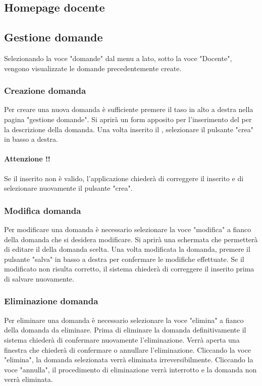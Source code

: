 \documentclass[12pt,a4paper]{article}
\begin{document}
	\subsection{Homepage docente}
	
    \subsection{Gestione domande}

    Selezionando la voce "domande" dal menu a lato, sotto la voce "Docente", vengono visualizzate le domande precedentemente create. 
	\subsubsection{Creazione domanda}
	Per creare una nuova domanda è sufficiente premere il taso in alto a destra nella pagina "gestione domande". 
	Si aprirà un form apposito per l'inserimento del  per la descrizione della domanda.
	Una volta inserito il , selezionare il pulsante "crea" in basso a destra.
	
	\paragraph{Attenzione !!}Se il  inserito non è valido, l'applicazione chiederà di correggere il  inserito e di selezionare nuovamente il pulsante "crea".
	\subsubsection{Modifica domanda}
	Per modificare una domanda è necessario selezionare la voce "modifica" a fianco della domanda che si desidera modificare. Si aprirà una schermata che permetterà di editare il  della domanda scelta.
	Una volta modificata la domanda, premere il pulsante "salva" in basso a destra per confermare le modifiche effettuate. 
	Se il  modificato non risulta corretto, il sistema chiederà di correggere il  inserito prima di salvare nuovamente.
	
	\subsubsection{Eliminazione domanda}
	Per eliminare una domanda è necessario selezionare la voce "elimina" a fianco della domanda da eliminare. Prima di eliminare la domanda definitivamente il sistema chiederà di confermare nuovamente l'eliminazione.
	Verrà aperta una finestra che chiederà di confermare o annullare l'eliminazione. Cliccando la voce "elimina", la domanda selezionata verrà eliminata irreversibilmente. Cliccando la voce "annulla", il procedimento di eliminazione verrà interrotto e la domanda non verrà eliminata.
		
\end{document}
